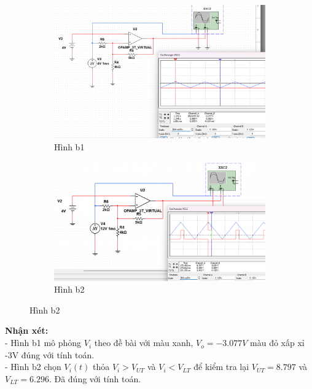 \begin{figure}[H]
    \centering
    \begin{subfigure}[b]{0.45\textwidth}
        \centering
        \includegraphics[width=\textwidth]{image/C12_b.png}
        \caption*{Hình b1}
    \end{subfigure}
    \hfill
    \begin{subfigure}[b]{0.5\textwidth}
        \centering
        \includegraphics[width=\textwidth]{image/C12_b_1.png}
        \caption*{Hình b2}
    \end{subfigure}
\end{figure}

\textbf{Nhận xét:}\\
- Hình b1 mô phỏng $V_i$ theo đề bài với màu xanh, $V_o=-3.077V$ màu đỏ xấp xỉ -3V đúng với tính toán.\\
- Hình b2 chọn $V_i(t)$ thỏa $V_i>V_{UT}$ và $V_i<V_{LT}$ để kiểm tra lại $V_{UT}=8.797$ và $V_{LT}=6.296$. Đã đúng với tính toán.\\
